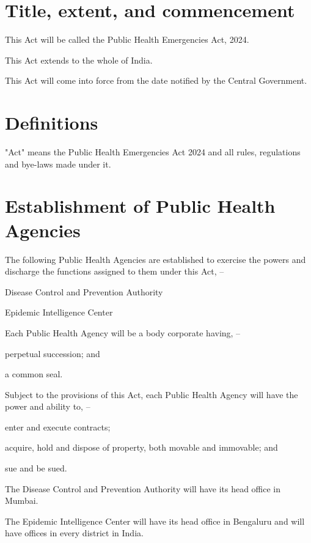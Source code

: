 \documentclass{indiabill}
\begin{document}
\section{Title, extent, and commencement}
	\begin{numstat}
		\item This Act will be called the Public Health Emergencies Act, 2024.
		\item This Act extends to the whole of India.
		\item This Act will come into force from the date notified by the Central Government.
	\end{numstat}

\section{Definitions}
	\begin{numstat}
	\item "Act" means the Public Health Emergencies Act 2024 and all rules, regulations and bye-laws made under it.
	\end{numstat}

\section{Establishment of Public Health Agencies}
	\begin{numstat}
	\item The following Public Health Agencies are established to exercise the powers and
	discharge the functions assigned to them under this Act, -- 
		\begin{alphstat}
		\item Disease Control and Prevention Authority
		\item Epidemic Intelligence Center 
		\end{alphstat}
	\item Each Public Health Agency will be a body corporate having, --
		\begin{alphstat}
		\item perpetual succession; and 
		\item a common seal. 
		\end{alphstat}
	\item Subject to the provisions of this Act, each Public Health Agency will have the power and ability to, --
		\begin{alphstat}
		\item enter and execute contracts;
		\item acquire, hold and dispose of property, both movable and immovable; and
		\item sue and be sued.
		\end{alphstat}
	\item The Disease Control and Prevention Authority will have its head office in Mumbai. 
	\item The Epidemic Intelligence Center will have its head office in Bengaluru and will have offices in every district in India. 
	\end{numstat}
\end{document}
